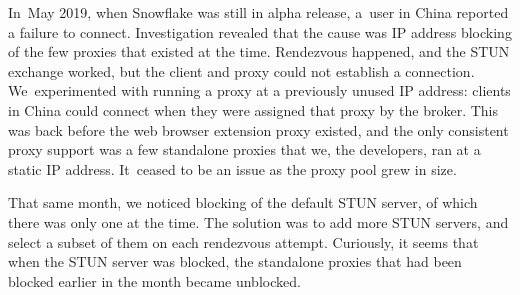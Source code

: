 \documentclass[letterpaper,twocolumn]{article}
\begin{document}
In~May 2019, when Snowflake was still in alpha release,
a~user in China reported a failure to connect.
Investigation revealed that the cause was IP address blocking of
the few proxies that existed at the time.
Rendezvous happened, and the STUN exchange worked,
but the client and proxy could not establish a connection.
We~experimented with running a proxy
at a previously unused IP address:
clients in China could connect when they were assigned
that proxy by the broker.
This was back before the web browser extension proxy existed,
and the only consistent proxy support was a few standalone proxies
that we, the developers, ran at a static IP address.
It~ceased to be an issue as the proxy pool grew in size.

That same month, we noticed blocking of
the default STUN server,
of which there was only one at the time.
The solution was to add more STUN servers,
and select a subset of them on each rendezvous attempt.
Curiously, it seems that when the STUN server was blocked,
the standalone proxies that had been blocked earlier in the month became unblocked.
\end{document}
